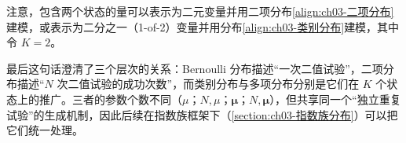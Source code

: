 \documentclass[../../main.tex]{subfiles}
\begin{document}
注意，包含两个状态的量可以表示为二元变量并用二项分布\eqref{align:ch03-二项分布}建模，或表示为二分之一（1-of-2）变量并用分布\eqref{align:ch03-类别分布}建模，其中令 $K=2$。

\begin{remark}
最后这句话澄清了三个层次的关系：Bernoulli 分布描述“一次二值试验”，二项分布描述“$N$ 次二值试验的成功次数”，而类别分布与多项分布分别是它们在 $K$ 个状态上的推广。三者的参数个数不同（$\mu$；$N,\mu$；$\boldsymbol{\mu}$；$N,\boldsymbol{\mu}$），但共享同一个“独立重复试验”的生成机制，因此后续在指数族框架下（\cref{section:ch03-指数族分布}）可以把它们统一处理。
\end{remark}
\end{document}
